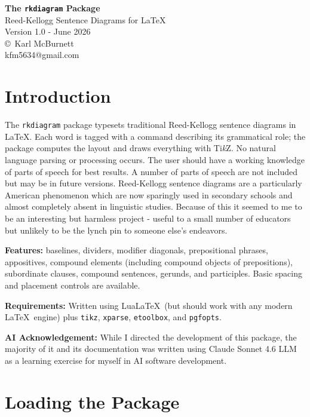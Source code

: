 \documentclass[11pt]{article}
\begin{document}
\begin{center}
  {\LARGE\bfseries The \texttt{rkdiagram} Package}\\[6pt]
  {\large Reed-Kellogg Sentence Diagrams for \LaTeX}\\[4pt]
  {\small Version 1.0} - June 2026\\
  \copyright \ Karl McBurnett\\
  kfm5634@gmail.com
\end{center}

\bigskip

\section{Introduction}

The \texttt{rkdiagram} package typesets traditional Reed-Kellogg sentence diagrams in \LaTeX.  Each word is tagged with a command describing its grammatical role; the package computes the layout and draws everything with Ti\textit{k}Z. No natural language parsing or processing occurs. The user should have a working knowledge of parts of speech for best results. A number of parts of speech are not included but may be in future versions. Reed-Kellogg sentence diagrams are a particularly American phenomenon which are now sparingly used in secondary schools and almost completely absent in linguistic studies. Because of this it seemed to me to be an interesting but harmless project - useful to a small number of educators but unlikely to be the lynch pin to someone else's endeavors.

\textbf{Features:} baselines, dividers, modifier diagonals, prepositional phrases, appositives, compound elements (including compound objects of prepositions), subordinate clauses, compound sentences, gerunds, and participles. Basic spacing and placement controls are available.

\textbf{Requirements:} Written using Lua\LaTeX\ (but should work with any modern \LaTeX \ engine) plus \texttt{tikz}, \texttt{xparse}, \texttt{etoolbox}, and \texttt{pgfopts}.

\textbf{AI Acknowledgement:} While I directed the development of this package, the majority of it and its documentation was written using Claude Sonnet 4.6 LLM as a learning exercise for myself in AI software development. 

\section{Loading the Package}
\end{document}
